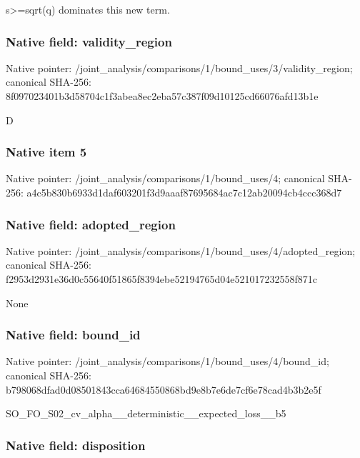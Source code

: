 \documentclass[10pt,a4paper]{article}
\begin{document}
s>=sqrt(q) dominates this new term.


\subsubsection{Native field: validity\_region}


Native pointer: /joint\_analysis/comparis\allowbreak{}ons/1/bound\_uses/3/valid\allowbreak{}ity\_region; canonical SHA-256: 8f097023401b3d58704c1f3a\allowbreak{}bea8ec2eba57c387f09d1012\allowbreak{}5cd66076afd13b1e


D


\subsubsection{Native item 5}


Native pointer: /joint\_analysis/comparis\allowbreak{}ons/1/bound\_uses/4; canonical SHA-256: a4c5b830b6933d1daf603201\allowbreak{}f3d9aaaf87695684ac7c12ab\allowbreak{}20094cb4ccc368d7



\subsubsection{Native field: adopted\_region}


Native pointer: /joint\_analysis/comparis\allowbreak{}ons/1/bound\_uses/4/adopt\allowbreak{}ed\_region; canonical SHA-256: f2953d2931e36d0c55640f51\allowbreak{}865f8394ebe52194765d04e5\allowbreak{}21017232558f871c


None


\subsubsection{Native field: bound\_id}


Native pointer: /joint\_analysis/comparis\allowbreak{}ons/1/bound\_uses/4/bound\allowbreak{}\_id; canonical SHA-256: b798068dfad0d08501843cca\allowbreak{}64684550868bd9e8b7e6de7c\allowbreak{}f6e78cad4b3b2e5f


SO\_FO\_S02\_cv\_alpha\_\_dete\allowbreak{}rministic\_\_expected\_loss\allowbreak{}\_\_b5


\subsubsection{Native field: disposition}
\end{document}
